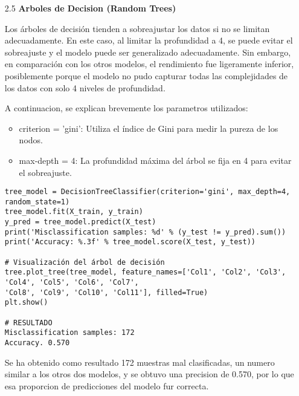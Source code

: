 \documentclass{article}
\begin{document}
\bigskip

\begin{itemize}

\item[2.5]  {\bf Arboles de Decision (Random Trees)}

Los árboles de decisión tienden a sobreajustar los datos si no se limitan adecuadamente. En este caso, al limitar la profundidad a 4, se puede evitar el sobreajuste y el modelo puede ser generalizado adecuadamente. Sin embargo, en comparación con los otros modelos, el rendimiento fue ligeramente inferior, posiblemente porque el modelo no pudo capturar todas las complejidades de los datos con solo 4 niveles de profundidad.

A continuacion, se explican brevemente los parametros utilizados:

\begin{itemize}

\item
criterion = 'gini': Utiliza el índice de Gini para medir la pureza de los nodos.

\item
max-depth = 4: La profundidad máxima del árbol se fija en 4 para evitar el sobreajuste.

\end{itemize}

\begin{tcolorbox}[width=14cm]
\begin{scriptsize}
\begin{verbatim}
tree_model = DecisionTreeClassifier(criterion='gini', max_depth=4, random_state=1)
tree_model.fit(X_train, y_train)
y_pred = tree_model.predict(X_test)
print('Misclassification samples: %d' % (y_test != y_pred).sum())
print('Accuracy: %.3f' % tree_model.score(X_test, y_test))

# Visualización del árbol de decisión
tree.plot_tree(tree_model, feature_names=['Col1', 'Col2', 'Col3', 'Col4', 'Col5', 'Col6', 'Col7', 
'Col8', 'Col9', 'Col10', 'Col11'], filled=True)
plt.show()

# RESULTADO
Misclassification samples: 172
Accuracy. 0.570
\end{verbatim}
\end{scriptsize}
\end{tcolorbox}

Se ha obtenido como resultado 172 muestras mal clasificadas, un numero similar a los otros dos modelos, y se obtuvo una precision de 0.570, por lo que esa proporcion de  predicciones del modelo fur correcta.

\end{itemize}
\end{document}
